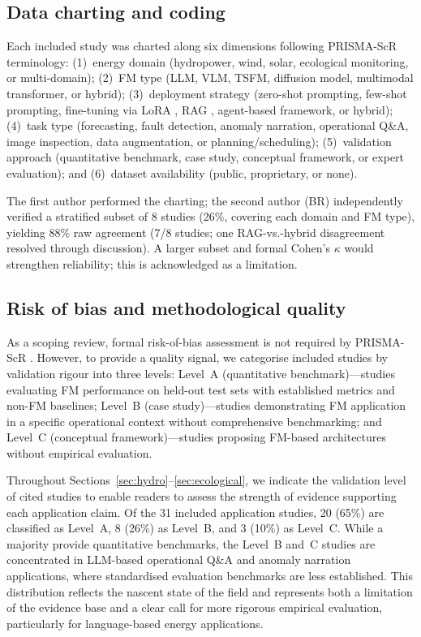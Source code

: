 \documentclass[preprint,12pt]{elsarticle}
\begin{document}
\subsection{Data charting and coding}
\label{subsec:coding}

Each included study was charted along six dimensions following PRISMA-ScR terminology: (1)~energy domain (hydropower, wind, solar, ecological monitoring, or multi-domain); (2)~FM type (LLM, VLM, TSFM, diffusion model, multimodal transformer, or hybrid); (3)~deployment strategy (zero-shot prompting, few-shot prompting, fine-tuning via LoRA \cite{hu2022lora}, RAG \cite{lewis2020rag}, agent-based framework, or hybrid); (4)~task type (forecasting, fault detection, anomaly narration, operational Q\&A, image inspection, data augmentation, or planning/scheduling); (5)~validation approach (quantitative benchmark, case study, conceptual framework, or expert evaluation); and (6)~dataset availability (public, proprietary, or none).

The first author performed the charting; the second author (BR) independently verified a stratified subset of 8 studies (26\%, covering each domain and FM type), yielding 88\% raw agreement (7/8 studies; one RAG-vs.-hybrid disagreement resolved through discussion). A larger subset and formal Cohen's $\kappa$ would strengthen reliability; this is acknowledged as a limitation.

\subsection{Risk of bias and methodological quality}
\label{subsec:risk_of_bias}

As a scoping review, formal risk-of-bias assessment is not required by PRISMA-ScR \cite{tricco2018prisma_scr}. However, to provide a quality signal, we categorise included studies by validation rigour into three levels: Level~A (quantitative benchmark)---studies evaluating FM performance on held-out test sets with established metrics and non-FM baselines; Level~B (case study)---studies demonstrating FM application in a specific operational context without comprehensive benchmarking; and Level~C (conceptual framework)---studies proposing FM-based architectures without empirical evaluation.

Throughout Sections~\ref{sec:hydro}--\ref{sec:ecological}, we indicate the validation level of cited studies to enable readers to assess the strength of evidence supporting each application claim. Of the 31 included application studies, 20 (65\%) are classified as Level~A, 8 (26\%) as Level~B, and 3 (10\%) as Level~C. While a majority provide quantitative benchmarks, the Level~B and~C studies are concentrated in LLM-based operational Q\&A and anomaly narration applications, where standardised evaluation benchmarks are less established. This distribution reflects the nascent state of the field and represents both a limitation of the evidence base and a clear call for more rigorous empirical evaluation, particularly for language-based energy applications.
\end{document}
